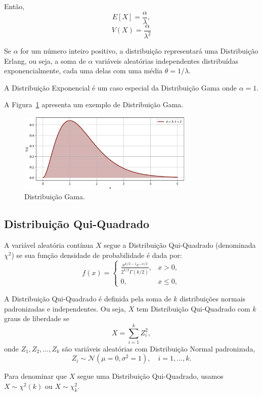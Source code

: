 \documentclass{article}
\begin{document}
Então,
    $$
    E[X] = \frac{\alpha}{\lambda},
    $$
    $$
    V(X) = \frac{\alpha}{\lambda^2}
    $$

Se $\alpha$ for um número inteiro positivo, a distribuição representará uma Distribuição Erlang, ou seja, a soma de $\alpha$ variáveis aleatórias independentes distribuídas exponencialmente, cada uma delas com uma média $\theta = 1/\lambda$.

A Distribuição Exponencial é um caso especial da Distribuição Gama onde $\alpha = 1$.

A Figura~\ref{fig:dist_cont_gama} apresenta um exemplo de Distribuição Gama.

\begin{figure}[H]
    \centering    \includegraphics[width=0.75\textwidth]{figuras/dist_cont_gama.png}
    \caption{Distribuição Gama.}
    \label{fig:dist_cont_gama}
\end{figure}

\subsection{Distribuição Qui-Quadrado}
A variável aleatória contínua $X$ segue a Distribuição Qui-Quadrado (denominada $\chi^2$) se sua função densidade de probabilidade é dada por:
    $$
    f(x) = 
    \begin{cases}
    \frac{x^{k/2 - 1} e^{-x/2}}{2^{k/2} \Gamma(k/2)}, & x > 0, \\
    0, & x \leq 0,
    \end{cases}
    $$

A Distribuição Qui-Quadrado é definida pela soma de $k$ distribuições normais padronizadas e independentes. Ou seja, $X$ tem Distribuição Qui-Quadrado com $k$ graus de liberdade se
    $$
    X = \sum_{i=1}^{k} Z_i^2,
    $$
onde $Z_1, Z_2, \ldots, Z_k$ são variáveis aleatórias com Distribuição Normal padronizada,
    $$
    Z_i \sim \mathcal{N}(\mu = 0, \sigma^2 = 1), \quad i = 1, \ldots, k.
    $$

Para denominar que $X$ segue uma Distribuição Qui-Quadrado, usamos $X \sim \chi^2(k)$ ou $X \sim \chi_k^2$.
\end{document}
